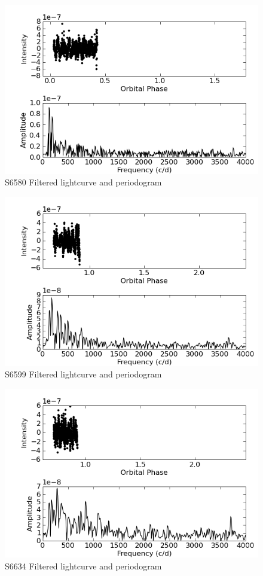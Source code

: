 \begin{figure}
 \centering
 \includegraphics[bb=0 0 600 400,width=0.85\columnwidth]{images/archive_phot/S6580/S6580d_FF.png}
 \caption{S6580 Filtered lightcurve and periodogram}
 \label{S6580_c_FF}
\end{figure}

\begin{figure}
 \centering
 \includegraphics[bb=0 0 600 400,width=0.85\columnwidth]{images/archive_phot/S6599/S6599d_FF.png}
 \caption{S6599 Filtered lightcurve and periodogram}
 \label{S6599_c_FF}
\end{figure}

\begin{figure}
 \centering
 \includegraphics[bb=0 0 600 400,width=0.85\columnwidth]{images/archive_phot/S6634/S6634d_FF.png}
 \caption{S6634 Filtered lightcurve and periodogram}
 \label{S6634_c_FF}
\end{figure}

